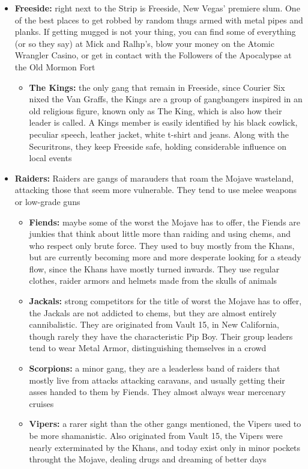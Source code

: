 \documentclass[11pt]{article} %
\begin{document}
\begin{itemize}
	\item \textbf{Freeside:} right next to the Strip is Freeside, New Vegas' premiere slum. One of the best places to get robbed by random thugs armed with metal pipes and planks. If getting mugged is not your thing, you can find some of everything (or so they say) at Mick and Ralhp's, blow your money on the Atomic Wrangler Casino, or get in contact with the Followers of the Apocalypse at the Old Mormon Fort
	\begin{itemize}
		\item \textbf{The Kings:} the only gang that remain in Freeside, since Courier Six nixed the Van Graffs, the Kings are a group of gangbangers inspired in an old religious figure, known only as The King, which is also how their leader is called. A Kings member is easily identified by his black cowlick, peculiar speech, leather jacket, white t-shirt and jeans. Along with the Securitrons, they keep Freeside safe, holding considerable influence on local events
	\end{itemize}

	\item \textbf{Raiders:} Raiders are gangs of marauders that roam the Mojave wasteland, attacking those that seem more vulnerable. They tend to use melee weapons or low-grade guns
	\begin{itemize}
		\item \textbf{Fiends:} maybe some of the worst the Mojave has to offer, the Fiends are junkies that think about little more than raiding and using chems, and who respect only brute force. They used to buy mostly from the Khans, but are currently becoming more and more desperate looking for a steady flow, since the Khans have mostly turned inwards. They use regular clothes, raider armors and helmets made from the skulls of animals
		\item \textbf{Jackals:} strong competitors for the title of worst the Mojave has to offer, the Jackals are not addicted to chems, but they are almost entirely cannibalistic. They are originated from Vault 15, in New California, though rarely they have the characteristic Pip Boy. Their group leaders tend to wear Metal Armor, distinguishing themselves in a crowd
		\item \textbf{Scorpions:} a minor gang, they are a leaderless band of raiders that mostly live from attacks attacking caravans, and usually getting their asses handed to them by Fiends. They almost always wear mercenary cruises
		\item \textbf{Vipers:} a rarer sight than the other gangs mentioned, the Vipers used to be more shamanistic. Also originated from Vault 15, the Vipers were nearly exterminated by the Khans, and today exist only in minor pockets throught the Mojave, dealing drugs and dreaming of better days
	\end{itemize}


\end{itemize}
\end{document}
